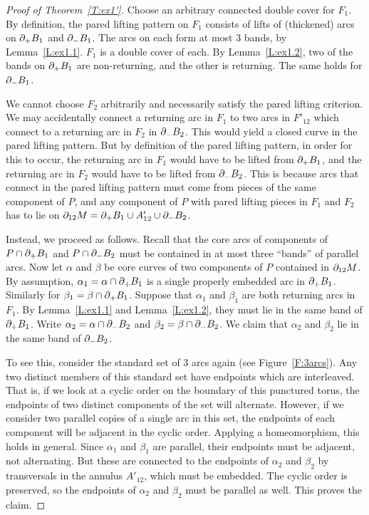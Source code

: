 \begin{proof}[Proof of Theorem~\ref{T:ex1'}]
Choose an arbitrary connected double cover for $F_1$. By definition, the pared
lifting pattern on $F_1$ consists of lifts of (thickened) arcs on $\partial_+ B_1$
and $\partial_- B_1$. The arcs on each form at most 3 bands, by Lemma~\ref{L:ex1.1}.
$F_1$ is a double cover of each.  By Lemma~\ref{L:ex1.2}, two of the bands on
$\partial_+B_1$ are non-returning, and the other is returning. The same holds for
$\partial_-B_1$.

We cannot choose $F_2$ arbitrarily and necessarily satisfy the pared lifting
criterion. We may accidentally connect a returning arc in $F_1$ to two arcs in
$F'_{12}$ which connect to a returning arc in $F_2$ in $\partial_-B_2$. This would
yield a closed curve in the pared lifting pattern. But by definition of the
pared lifting pattern, in order for this to occur, the returning arc in $F_1$
would have to be lifted from $\partial_+ B_1$, and the returning arc in $F_2$ would
have to be lifted from $\partial_- B_2$. This is because arcs that connect in the
pared lifting pattern must come from pieces of the same component of $P$, and
any component of $P$ with pared lifting pieces in $F_1$ and $F_2$ has to lie on
$\partial_{12} M = \partial_+ B_1 \cup A'_{12} \cup \partial_- B_2$.

Instead, we proceed as follows. Recall that the core arcs of components of $P
\cap \partial_+B_1$ and $P\cap \partial_- B_2$ must be contained in at most three
``bands'' of parallel arcs. Now let $\alpha$ and $\beta$ be core curves of two
components of $P$ contained in $\partial_{12}M$. By assumption, $\alpha_1 = \alpha
\cap \partial_+B_1$ is a single properly embedded arc in $\partial_+B_1$.  Similarly for
$\beta_1 = \beta \cap \partial_+B_1$.  Suppose that $\alpha_1$ and $\beta_1$ are
both returning arcs in $F_1$.  By Lemma~\ref{L:ex1.1} and Lemma~\ref{L:ex1.2},
they must lie in the same band of $\partial_+B_1$.  Write $\alpha_2 = \alpha \cap
\partial_-B_2$ and $\beta_2 = \beta \cap \partial_-B_2$. We claim that $\alpha_2$ and
$\beta_2$ lie in the same band of $\partial_-B_2$.

To see this, consider the standard set of 3 arcs again (see
Figure~\ref{F:3arcs}). Any two distinct members of this standard set have
endpoints which are interleaved. That is, if we look at a cyclic order on the
boundary of this punctured torus, the endpoints of two distinct components of
the set will alternate. However, if we consider two parallel copies of a single
arc in this set, the endpoints of each component will be adjacent in the cyclic
order. Applying a homeomorphism, this holds in general. Since $\alpha_1$ and
$\beta_1$ are parallel, their endpoints must be adjacent, not alternating. But
these are connected to the endpoints of $\alpha_2$ and $\beta_2$ by
transversals in the annulus $A'_{12}$, which must be embedded. The cyclic order
is preserved, so the endpoints of $\alpha_2$ and $\beta_2$ must be parallel as
well. This proves the claim.


\end{proof}
